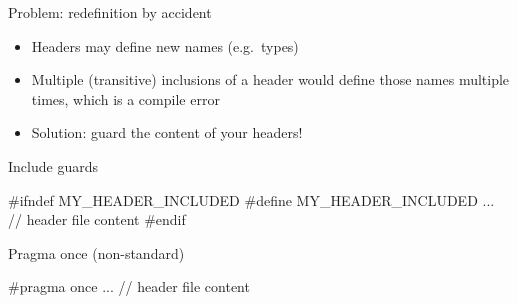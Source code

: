 \begin{frame}[fragile]
  \begin{block}{Problem: redefinition by accident}
    \begin{itemize}
      \item Headers may define new names (e.g.\ types)
      \item Multiple (transitive) inclusions of a header would define those names multiple times, which is a compile error
      \item Solution: guard the content of your headers!
    \end{itemize}
  \end{block}
  \begin{block}{Include guards}
    \begin{cppcode*}{}
      #ifndef MY_HEADER_INCLUDED
      #define MY_HEADER_INCLUDED
      ... // header file content
      #endif
    \end{cppcode*}
  \end{block}
  \begin{block}{Pragma once (non-standard)}
    \begin{cppcode*}{}
      #pragma once
      ... // header file content
    \end{cppcode*}
  \end{block}
\end{frame}
